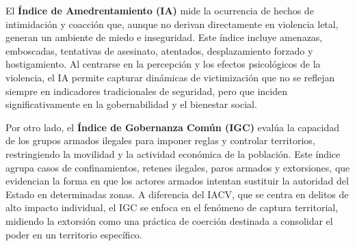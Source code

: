 El \textbf{Índice de Amedrentamiento (IA)} mide la ocurrencia de hechos de intimidación y coacción que, aunque no derivan directamente en violencia letal, generan un ambiente de miedo e inseguridad. Este índice incluye amenazas, emboscadas, tentativas de asesinato, atentados, desplazamiento forzado y hostigamiento. Al centrarse en la percepción y los efectos psicológicos de la violencia, el IA permite capturar dinámicas de victimización que no se reflejan siempre en indicadores tradicionales de seguridad, pero que inciden significativamente en la gobernabilidad y el bienestar social.

Por otro lado, el \textbf{Índice de Gobernanza Común (IGC)} evalúa la capacidad de los grupos armados ilegales para imponer reglas y controlar territorios, restringiendo la movilidad y la actividad económica de la población. Este índice agrupa casos de confinamientos, retenes ilegales, paros armados y extorsiones, que evidencian la forma en que los actores armados intentan sustituir la autoridad del Estado en determinadas zonas. A diferencia del IACV, que se centra en delitos de alto impacto individual, el IGC se enfoca en el fenómeno de captura territorial, midiendo la extorsión como una práctica de coerción destinada a consolidar el poder en un territorio específico.
